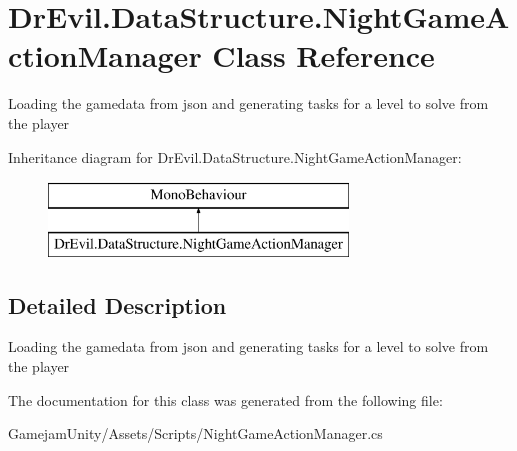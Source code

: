 \hypertarget{class_dr_evil_1_1_data_structure_1_1_night_game_action_manager}{}\section{Dr\+Evil.\+Data\+Structure.\+Night\+Game\+Action\+Manager Class Reference}
\label{class_dr_evil_1_1_data_structure_1_1_night_game_action_manager}


Loading the gamedata from json and generating tasks for a level to solve from the player  


Inheritance diagram for Dr\+Evil.\+Data\+Structure.\+Night\+Game\+Action\+Manager\+:\begin{figure}[H]
\begin{center}
\leavevmode
\includegraphics[height=2.000000cm]{class_dr_evil_1_1_data_structure_1_1_night_game_action_manager}
\end{center}
\end{figure}


\subsection{Detailed Description}
Loading the gamedata from json and generating tasks for a level to solve from the player 



The documentation for this class was generated from the following file\+:\begin{DoxyCompactItemize}
\item 
Gamejam\+Unity/\+Assets/\+Scripts/Night\+Game\+Action\+Manager.\+cs\end{DoxyCompactItemize}
